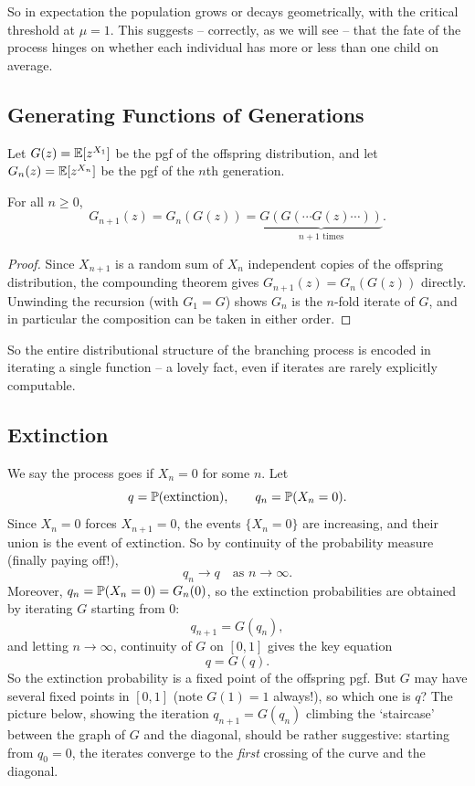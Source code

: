 \documentclass[a4paper]{scrartcl}
\begin{document}
So in expectation the population grows or decays geometrically, with the critical threshold at $\mu = 1$. This suggests -- correctly, as we will see -- that the fate of the process hinges on whether each individual has more or less than one child on average.

\subsection{Generating Functions of Generations}

Let $G(z) = \mathbb{E}[z^{X_1}]$ be the pgf of the offspring distribution, and let $G_n(z) = \mathbb{E}[z^{X_n}]$ be the pgf of the $n$th generation.

\begin{theorem}
	For all $n \geq 0$,
	$$
	G_{n + 1}(z) = G_n(G(z)) = \underbrace{G(G(\cdots G(z) \cdots))}_{n + 1 \text{ times}}.
	$$
\end{theorem}
\begin{proof}
	Since $X_{n+1}$ is a random sum of $X_n$ independent copies of the offspring distribution, the compounding theorem gives $G_{n + 1}(z) = G_n(G(z))$ directly. Unwinding the recursion (with $G_1 = G$) shows $G_n$ is the $n$-fold iterate of $G$, and in particular the composition can be taken in either order.
\end{proof}

So the entire distributional structure of the branching process is encoded in iterating a single function -- a lovely fact, even if iterates are rarely explicitly computable.

\subsection{Extinction}

We say the process goes  if $X_n = 0$ for some $n$. Let
$$
q = \mathbb{P}(\text{extinction}), \qquad q_n = \mathbb{P}(X_n = 0).
$$
Since $X_n = 0$ forces $X_{n+1} = 0$, the events $\{X_n = 0\}$ are increasing, and their union is the event of extinction. So by continuity of the probability measure (finally paying off!),
$$
q_n \longrightarrow q \quad \text{as } n \rightarrow \infty.
$$
Moreover, $q_n = \mathbb{P}(X_n = 0) = G_n(0)$, so the extinction probabilities are obtained by iterating $G$ starting from $0$:
$$
q_{n + 1} = G(q_n),
$$
and letting $n \rightarrow \infty$, continuity of $G$ on $[0, 1]$ gives the key equation
$$
q = G(q).
$$
So the extinction probability is a fixed point of the offspring pgf. But $G$ may have several fixed points in $[0,1]$ (note $G(1) = 1$ always!), so which one is $q$? The picture below, showing the iteration $q_{n+1} = G(q_n)$ climbing the `staircase' between the graph of $G$ and the diagonal, should be rather suggestive: starting from $q_0 = 0$, the iterates converge to the \emph{first} crossing of the curve and the diagonal.
\end{document}

